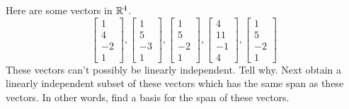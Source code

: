 \documentclass{ximera}
\begin{document}
\begin{problem}\label{prb:3.29} Here are some vectors in $\mathbb{R}^{4}$.
\begin{equation*}
\left[
\begin{array}{r}
1 \\
4 \\
-2 \\
1
\end{array}
\right] ,\left[
\begin{array}{r}
1 \\
5 \\
-3 \\
1
\end{array}
\right] ,\left[
\begin{array}{r}
1 \\
5 \\
-2 \\
1
\end{array}
\right] ,\left[
\begin{array}{r}
4 \\
11 \\
-1 \\
4
\end{array}
\right] ,\left[
\begin{array}{r}
1 \\
5 \\
-2 \\
1
\end{array}
\right]
\end{equation*}
These vectors can't possibly be linearly independent. Tell why. Next obtain a
linearly independent subset of these vectors which has the same span as
these vectors. In other words, find a basis for the span of these vectors.
\end{problem}
\end{document}
